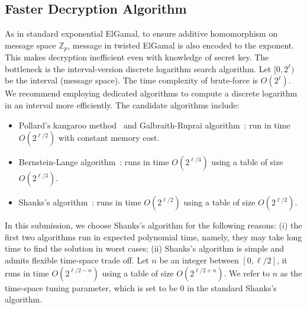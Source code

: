 \documentclass[a4paper,10pt]{article}
\begin{document}
\subsection{Faster Decryption Algorithm}
As in standard exponential ElGamal, to ensure additive homomorphism on message space $\mathbb{Z}_p$, 
message in twisted ElGamal is also encoded to the exponent. 
This makes decryption inefficient even with knowledge of secret key. 
The bottleneck is the interval-version discrete logarithm search algorithm. 
Let $[0, 2^\ell)$ be the interval (message space).  
The time complexity of brute-force is $O(2^\ell)$.       
We recommend employing dedicated algorithms to compute a discrete logarithm in an interval more efficiently. 
The candidate algorithms include: 
\begin{itemize} \itemsep 1pt \parskip 0pt \parsep 0pt
    \item Pollard's kangaroo method~\cite{Pollard1978} and Galbraith-Ruprai algorithm~\cite{GR2010-PKC}: 
        run in time $O(2^{\ell/2})$ with constant memory cost. 
    
    \item Bernstein-Lange algorithm~\cite{BL2012}: runs in time $O(2^{\ell/3})$ using a table of size $O(2^{\ell/3})$.

    \item Shanks's algorithm~\cite{Shanks1971}: runs in time $O(2^{\ell/2})$ using a table of size $O(2^{\ell/2})$.   
\end{itemize} 
In this submission, we choose Shanks's algorithm for the following reasons: 
(i) the first two algorithms run in expected polynomial time, namely, 
they may take long time to find the solution in worst cases; 
(ii) Shanks's algorithm is simple and admits flexible time-space trade off. 
Let $n$ be an integer between $[0, \ell/2]$, it runs in time $O(2^{\ell/2-n})$ using a table of size $O(2^{\ell/2+n})$.
We refer to $n$ as the time-space tuning parameter, which is set to be $0$ in the standard Shanks's algorithm.  
\end{document}
